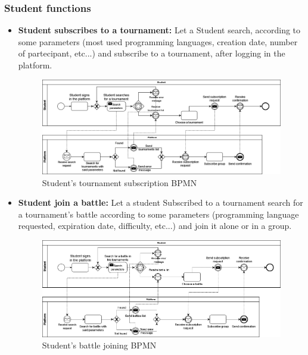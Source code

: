 \documentclass{article}
\begin{document}
{\subsubsection{Student functions}
\begin{itemize}
    \item \textbf{Student subscribes to a tournament:} Let a Student search, according to some parameters 
    (most used programming languages, creation date, number of partecipant, etc...) and subscribe to a tournament, after logging in the platform.
          \begin{figure}[H]
              \centering
              \hspace*{-1.1cm}\includegraphics[scale=0.4]{images/BPMN/BPMN3.png}
              \caption{Student's tournament subscription BPMN}
              \label{fig:studTournamentSubBPMN}
          \end{figure}

    \item \textbf{Student join a battle:} Let a student Subscribed to a tournament search for a tournament's battle according 
    to some parameters (programming language requested, expiration date, difficulty, etc...) and join it alone or in a group.
          \begin{figure}[H]
              \centering
              \hspace*{-1.1cm}\includegraphics[scale=0.4]{images/BPMN/BPMN4.png}
              \caption{Student's battle joining BPMN}
              \label{fig:studBattleJoinBPMN}
          \end{figure}


\end{itemize}}
\end{document}
